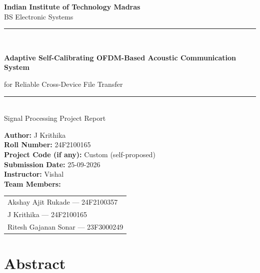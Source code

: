 \documentclass[11pt,a4paper]{report}
\begin{document}
\begin{titlepage}
    \centering
    \vspace*{1cm}

    {\Large \textbf{Indian Institute of Technology Madras}}\\[0.3cm]
    {\large BS Electronic Systems}\\[2cm]

    \rule{\linewidth}{0.5mm}\\[0.5cm]
    {\Huge \textbf{Adaptive Self-Calibrating OFDM-Based Acoustic Communication System}\par}
    \vspace{0.4cm}
    {\Large for Reliable Cross-Device File Transfer}\\
    \rule{\linewidth}{0.5mm}\\[2cm]

    {\large Signal Processing Project Report}\\[2cm]

    \begin{flushleft}
    \textbf{Author:} J Krithika\\[0.3cm]
    \textbf{Roll Number:} 24F2100165\\[0.3cm]
    \textbf{Project Code (if any):} Custom (self-proposed)\\[0.3cm]
    \textbf{Submission Date:} 25-09-2026\\[0.3cm]
    \textbf{Instructor:} Vishal\\[0.3cm]
    \textbf{Team Members:} \begin{tabular}[t]{@{}l@{}}Akshay Ajit Rukade --- 24F2100357 \\ J Krithika --- 24F2100165 \\ Ritesh Gajanan Sonar --- 23F3000249\end{tabular}
    \end{flushleft}

    \vfill
\end{titlepage}

\tableofcontents
\newpage

\chapter*{Abstract}
\end{document}
